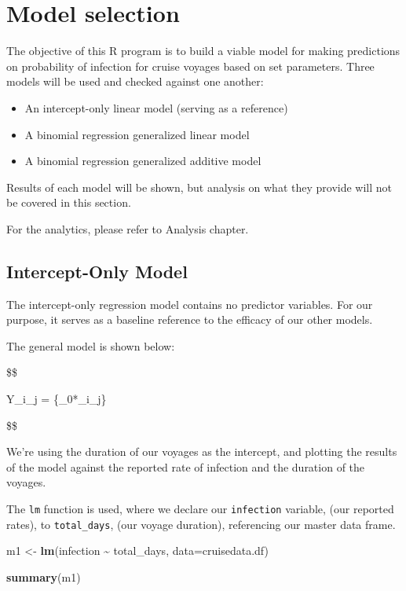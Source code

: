 \documentclass[
  11,
]{book}
\newenvironment{Shaded}{\begin{snugshade}}{\end{snugshade}}
\newcommand{\AttributeTok}[1]{\textcolor[rgb]{0.27,0.27,0.27}{#1}}
\newcommand{\FunctionTok}[1]{\textcolor[rgb]{0.27,0.27,0.27}{\textbf{#1}}}
\newcommand{\NormalTok}[1]{#1}
\newcommand{\OtherTok}[1]{\textcolor[rgb]{0.37,0.37,0.37}{#1}}
\newcommand{\SpecialCharTok}[1]{\textcolor[rgb]{0.43,0.43,0.43}{\textbf{#1}}}
\begin{document}
\hypertarget{model-selection}{%
\chapter*{Model selection}\label{model-selection}}


The objective of this R program is to build a viable model for making predictions on probability of infection for cruise voyages based on set parameters. Three models will be used and checked against one another:

\begin{itemize}
\item
  An intercept-only linear model (serving as a reference)
\item
  A binomial regression generalized linear model
\item
  A binomial regression generalized additive model
\end{itemize}

Results of each model will be shown, but analysis on what they provide will not be covered in this section.

For the analytics, please refer to Analysis chapter.

\hypertarget{intercept-only-model}{%
\section*{Intercept-Only Model}\label{intercept-only-model}}


The intercept-only regression model contains no predictor variables. For our purpose, it serves as a baseline reference to the efficacy of our other models.

The general model is shown below:

\$\$

Y\_i\_j = \{\beta\_0*\epsilon\_i\_j\}

\$\$

We're using the duration of our voyages as the intercept, and plotting the results of the model against the reported rate of infection and the duration of the voyages.

The \texttt{lm} function is used, where we declare our \texttt{infection} variable, (our reported rates), to \texttt{total\_days}, (our voyage duration), referencing our master data frame.

\begin{Shaded}
\begin{Highlighting}[]
\NormalTok{m1 }\OtherTok{\textless{}{-}} \FunctionTok{lm}\NormalTok{(infection }\SpecialCharTok{\textasciitilde{}}\NormalTok{ total\_days, }\AttributeTok{data=}\NormalTok{cruisedata.df)}

\FunctionTok{summary}\NormalTok{(m1)}
\end{Highlighting}
\end{Shaded}
\end{document}
